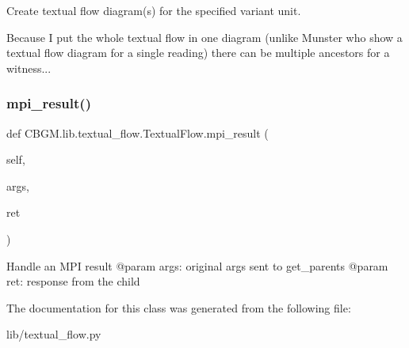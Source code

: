 \begin{DoxyVerb}Create textual flow diagram(s) for the specified variant unit.

Because I put the whole textual flow in one diagram (unlike Munster who
show a textual flow diagram for a single reading) there can be multiple
ancestors for a witness...
\end{DoxyVerb}
 \mbox{\label{classCBGM_1_1lib_1_1textual__flow_1_1TextualFlow_af60312ac039b52328a2fca08923f4df8}} 
\subsubsection{\texorpdfstring{mpi\+\_\+result()}{mpi\_result()}}
{\footnotesize\ttfamily def C\+B\+G\+M.\+lib.\+textual\+\_\+flow.\+Textual\+Flow.\+mpi\+\_\+result (\begin{DoxyParamCaption}\item[{}]{self,  }\item[{}]{args,  }\item[{}]{ret }\end{DoxyParamCaption})}

\begin{DoxyVerb}Handle an MPI result
@param args: original args sent to get_parents
@param ret: response from the child
\end{DoxyVerb}
 

The documentation for this class was generated from the following file\+:\begin{DoxyCompactItemize}
\item 
lib/textual\+\_\+flow.\+py\end{DoxyCompactItemize}

